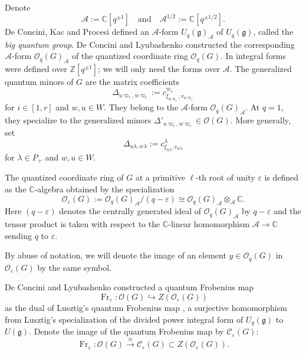 \documentclass[11pt]{amsart}
\theoremstyle{plain}
\def \Zset {{\mathbb Z}}
\def \Cset {{\mathbb C}}
\def \cA {\mathcal{A}}
\def \cC {\mathcal{C}}
\def \cAt {{\mathcal{A}}^{1/2}}
\def \OO {{\mathcal{O}}}
\def \vpi {\varpi}
\def \la {\lambda}
\def \ep {\varepsilon}
\def \g  {\mathfrak{g}}   %
\DeclareMathOperator \Fr { {\mathrm{Fr}}}
\begin{document}
Denote 
\[
\cA := \Cset[q^{\pm 1}] 
\quad \mbox{and} \quad 
\cAt := \Cset[q^{\pm 1/2}].
\]
De Concini, Kac and Procesi \cite{DK,DKP} defined an $\cA$-form $U_q(\g)_{\cA}$ of $U_q(\g)$, called the {\em{big quantum group}}. De Concini and Lyubashenko \cite{DCL94} constructed the corresponding $\cA$-form $\OO_q(G)_{\cA}$ of the quantized coordinate ring $\OO_q(G)$. In \cite{DK,DCL94} integral forms were defined over $\Zset[q^{\pm 1}]$; we will only need the forms over $\cA$. The generalized quantum minors of $G$ are the matrix coefficients 
\[
\Delta_{u \vpi_i, w \vpi_i} := c_{\xi_{u \vpi_i}, v_{w \vpi_i}}^{\vpi_i}
\]
for $i \in [1,r]$ and $w, u \in W$. 
They belong to the $\cA$-form $\OO_q(G)_{\cA}$.
At $q=1$, they specialize to the generalized minors $\Delta'_{u \vpi_i, w \vpi_i} \in \OO(G)$. More generally, set 
\begin{equation}
\label{la}
\Delta_{u \la, w \la} := c_{\xi_{u \la}, v_{w\la}}^{\la}
\end{equation}
for $\la \in P_+$ and $w, u \in W$. 

The quantized coordinate ring of $G$ at a primitive $\ell$-th root of unity $\ep$ is defined \cite{DCL94} as the $\Cset$-algebra obtained by the specialization 
\begin{equation}
\label{OepG}
\OO_\ep(G) := \OO_q(G)_{\cA}/ (q - \ep)
\cong \OO_q(G)_{\cA} \otimes_{\cA} \Cset.
\end{equation}
Here $(q-\ep)$ denotes the centrally generated ideal of $\OO_q(G)_{\cA}$ by $q - \ep$ and the tensor product is taken with respect to the $\Cset$-linear homomorphism $\cA \to \Cset$ sending $q$ to $\ep$. 

By abuse of notation, we will denote the image of an element $y \in \OO_q(G)$ in $\OO_\ep(G)$ by the same symbol. 

De Concini and Lyubashenko constructed a quantum Frobenius map 
\[
\Fr_\ep : \OO(G) \hookrightarrow Z(\OO_\ep(G))
\]
as the dual of Lusztig's quantum Frobenius map \cite{Lus2}, a surjective homomorphism from Lusztig's specialization of the divided power integral form \cite{Lus} of $U_q(\g)$ to $U(\g)$. Denote the image of the quantum Frobenius map by $\cC_\ep(G)$:
\begin{equation}
\label{qFr}
\Fr_\ep : \OO(G) \stackrel{\cong}{\longrightarrow} \cC_\ep(G) \subset Z( \OO_\ep(G)).
\end{equation}
\end{document}
